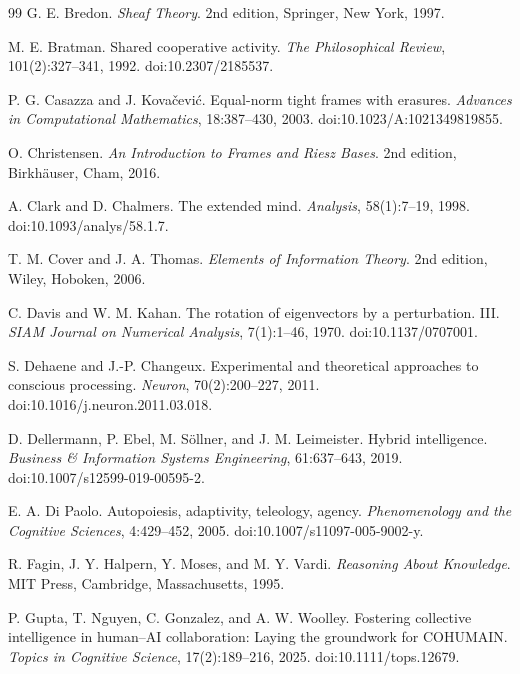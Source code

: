 \begin{thebibliography}{99}
G. E. Bredon.
\newblock \emph{Sheaf Theory}.
\newblock 2nd edition, Springer, New York, 1997.

M. E. Bratman.
\newblock Shared cooperative activity.
\newblock \emph{The Philosophical Review}, 101(2):327--341, 1992.
\newblock doi:10.2307/2185537.

P. G. Casazza and J. Kova\v{c}evi\'c.
\newblock Equal-norm tight frames with erasures.
\newblock \emph{Advances in Computational Mathematics}, 18:387--430, 2003.
\newblock doi:10.1023/A:1021349819855.

O. Christensen.
\newblock \emph{An Introduction to Frames and Riesz Bases}.
\newblock 2nd edition, Birkh\"auser, Cham, 2016.

A. Clark and D. Chalmers.
\newblock The extended mind.
\newblock \emph{Analysis}, 58(1):7--19, 1998.
\newblock doi:10.1093/analys/58.1.7.

T. M. Cover and J. A. Thomas.
\newblock \emph{Elements of Information Theory}.
\newblock 2nd edition, Wiley, Hoboken, 2006.

C. Davis and W. M. Kahan.
\newblock The rotation of eigenvectors by a perturbation. III.
\newblock \emph{SIAM Journal on Numerical Analysis}, 7(1):1--46, 1970.
\newblock doi:10.1137/0707001.

S. Dehaene and J.-P. Changeux.
\newblock Experimental and theoretical approaches to conscious processing.
\newblock \emph{Neuron}, 70(2):200--227, 2011.
\newblock doi:10.1016/j.neuron.2011.03.018.

D. Dellermann, P. Ebel, M. S\"ollner, and J. M. Leimeister.
\newblock Hybrid intelligence.
\newblock \emph{Business \& Information Systems Engineering}, 61:637--643, 2019.
\newblock doi:10.1007/s12599-019-00595-2.

E. A. Di Paolo.
\newblock Autopoiesis, adaptivity, teleology, agency.
\newblock \emph{Phenomenology and the Cognitive Sciences}, 4:429--452, 2005.
\newblock doi:10.1007/s11097-005-9002-y.

R. Fagin, J. Y. Halpern, Y. Moses, and M. Y. Vardi.
\newblock \emph{Reasoning About Knowledge}.
\newblock MIT Press, Cambridge, Massachusetts, 1995.

P. Gupta, T. Nguyen, C. Gonzalez, and A. W. Woolley.
\newblock Fostering collective intelligence in human--AI collaboration: Laying the groundwork for COHUMAIN.
\newblock \emph{Topics in Cognitive Science}, 17(2):189--216, 2025.
\newblock doi:10.1111/tops.12679.


\end{thebibliography}
